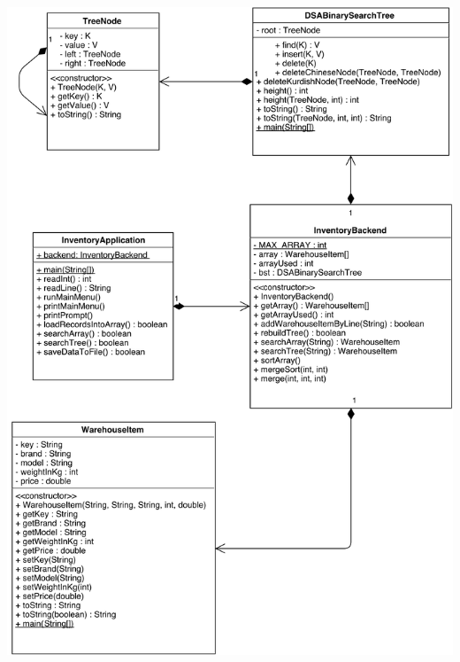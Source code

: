 \documentclass[a4paper,12pt]{article}
\begin{document}
\includegraphics[width=15cm]{umldiagram.png}
\end{document}
